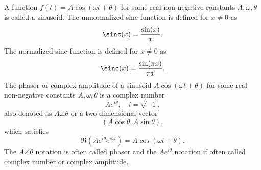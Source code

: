 \documentclass[a4paper,12pt]{report}
\begin{document}
A function $f(t)=A\cos(\omega t+\theta)$ for some real non-negative constants $A,\omega,\theta$ is called a sinusoid.
The unnormalized sinc function is defined for $x\neq 0$ as
\[\sinc(x)=\frac{\sin(x)}{x}.\]
The normalized sinc function is defined for $x\neq 0$ as
\[\sinc(x)=\frac{\sin(\pi x)}{\pi x}.\]
The phasor or complex amplitude of a sinusoid $A\cos(\omega t+\theta)$ for some real non-negative constants $A,\omega,\theta$ is a complex number
\[Ae^{i\theta},\quad i=\sqrt{-1},\]
also denoted as $A\angle\theta$ or a two-dimensional vector
\[(A\cos\theta,A\sin\theta),\]
which satisfies
\[\Re(Ae^{i\theta}e^{i\omega t})=A\cos(\omega t+\theta).\]
The $A\angle\theta$ notation is often called phasor and the $Ae^{i\theta}$ notation if often called complex number or complex amplitude.
\end{document}
